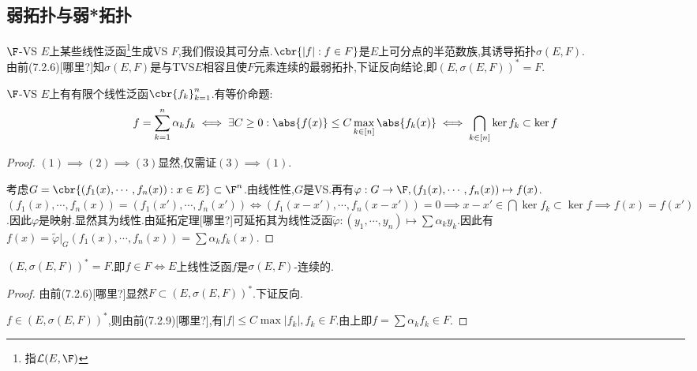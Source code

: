 \documentclass{article}
\begin{document}
\subsection{弱拓扑与弱*拓扑}
$\F$-VS $E$上某些线性泛函\footnote{指$\mathcal{L}(E,\F)$}生成VS $F$,我们假设其可分点.$\cbr{|f|:f\in F}$是$E$上可分点的半范数族,其诱导拓扑$\sigma(E,F)$.\\由前(7.2.6)[哪里?]知$\sigma(E,F)$是与TVS$E$相容且使$F$元素连续的最弱拓扑,下证反向结论,即$(E,\sigma(E,F))^*=F$.

\begin{lemma}
    $\F$-VS $E$上有有限个线性泛函$\cbr{f_k}_{k=1}^n$.有等价命题:$$f=\sum_{k=1}^n \alpha_kf_k\iff \exists C\geq 0:\abs{f(x)}\leq C\max_{k\in [n]}\abs{f_k(x)}\iff \bigcap_{k\in [n]}\ker f_k\subset \ker f$$
\end{lemma}
\begin{proof}
    $(1)\implies (2)\implies (3)$显然,仅需证$(3)\implies (1)$.

    考虑$G=\cbr{(f_1(x),\cdots,f_n(x)):x\in E}\subset \F^n$.由线性性,$G$是VS.再有$\varphi:G\to \F, (f_1(x),\cdots,f_n(x))\mapsto f(x)$.\\
    $(f_1(x),\cdots,f_n(x))=(f_1(x'),\cdots,f_n(x'))\iff (f_1(x-x'),\cdots,f_n(x-x'))=0\implies x-x'\in \bigcap \ker f_k\subset \ker f\implies f(x)=f(x')$.因此$\varphi$是映射.显然其为线性.由延拓定理[哪里?]可延拓其为线性泛函$\tilde{\varphi}:(y_1,\cdots,y_n)\mapsto\sum \alpha_ky_k$.因此有$f(x)=\tilde{\varphi}|_G(f_1(x),\cdots,f_n(x))=\sum \alpha_kf_k(x)$.
\end{proof}
\begin{theorem}
    $(E,\sigma(E,F))^*=F$.即$f\in F\iff E$上线性泛函$f$是$\sigma(E,F)$-连续的.
\end{theorem}
\begin{proof}
    由前(7.2.6)[哪里?]显然$F\subset (E,\sigma(E,F))^*$.下证反向.

    $f\in (E,\sigma(E,F))^*$,则由前(7.2.9)[哪里?],有$|f|\leq C\max |f_k|,f_k\in F$.由上即$f=\sum \alpha_kf_k\in F$.
\end{proof}
\end{document}
